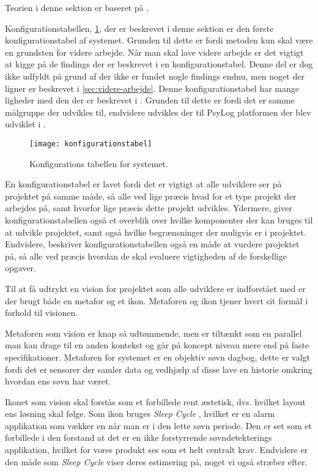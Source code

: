 Teorien i denne sektion er baseret på \citet{art:essence}.

Konfigurationstabellen, \cref{tab:konfigurationsTabel}, der er beskrevet i denne sektion er den første konfigurationstabel af systemet.
Grunden til dette er fordi metoden kun skal være en grundsten for videre arbejde.
Når man skal lave videre arbejde er det vigtigt at kigge på de findings der er beskrevet i en konfigurationstabel.
Denne del er dog ikke udfyldt på grund af der ikke er fundet nogle findings endnu, men noget der ligner er beskrevet i \cref{sec:videre-arbejde}.
Denne konfigurationstabel har mange ligheder med den der er beskrevet i \citet{misc:faellesrapp}.
Grunden til dette er fordi det er samme målgruppe der udvikles til, endvidere udvikles der til PsyLog platformen der blev udviklet i \citet{misc:faellesrapp}.

\begin{figure}[]
	\centering
	\texttt{[image: konfigurationstabel]}
	\caption{Konfigurations tabellen for systemet.}
	\label{tab:konfigurationsTabel}
\end{figure}

En konfigurationstabel er lavet fordi det er vigtigt at alle udviklere ser på projektet på samme måde, så alle ved lige præcis hvad for et type projekt der arbejdes på, samt hvorfor lige præcis dette projekt udvikles.
Ydermere, giver konfigurationstabellen også et overblik over hvilke komponenter der kan bruges til at udvikle projektet, samt også hvilke begrænsninger der muligvis er i projektet.
Endvidere, beskriver konfigurationstabellen også en måde at vurdere projektet på, så alle ved præcis hvordan de skal evaluere vigtigheden af de forskellige opgaver.

Til at få udtrykt en vision for projektet som alle udviklere er indforstået med er der brugt både en metafor og et ikon.
Metaforen og ikon tjener hvert sit formål i forhold til visionen.

Metaforen som vision er knap så udtømmende, men er tiltænkt som en parallel man kan drage til en anden kontekst og går på koncept niveau mere end på faste specifikationer.
Metaforen for systemet er en objektiv søvn dagbog, dette er valgt fordi det er sensorer der samler data og vedhjælp af disse lave en historie omkring hvordan ens søvn har været.

Ikonet som vision skal forstås som et forbillede rent æstetisk, dvs. hvilket layout ens løsning skal følge.
Som ikon bruges \textit{Sleep Cycle} \citep{misc:sleepCycle}, hvilket er en alarm applikation som vækker en når man er i den lette søvn periode.
Den er set som et forbillede i den forstand at det er en ikke forstyrrende søvndetekterings applikation, hvilket for vores produkt ses som et helt centralt krav.
Endvidere er den måde som \textit{Sleep Cycle} viser deres estimering på, noget vi også stræber efter.
